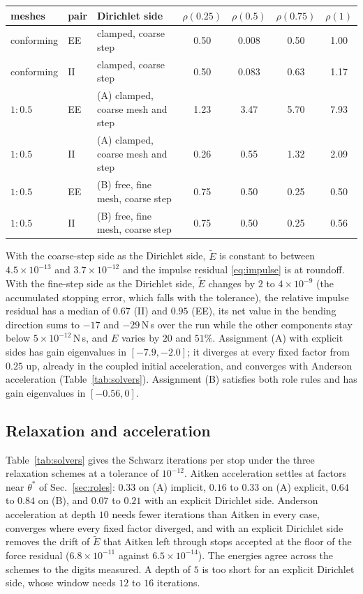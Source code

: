\documentclass[11pt]{article}
\begin{document}
\begin{table}[htbp]
\medskip
\begin{tabular}{lllcccc}
\toprule
meshes & pair & Dirichlet side & $\rho(0.25)$ & $\rho(0.5)$ & $\rho(0.75)$ & $\rho(1)$ \\
\midrule
conforming & EE & clamped, coarse step & 0.50 & 0.008 & 0.50 & 1.00 \\
conforming & II & clamped, coarse step & 0.50 & 0.083 & 0.63 & 1.17 \\
$1{:}0.5$ & EE & (A) clamped, coarse mesh and step & 1.23 & 3.47 & 5.70 & 7.93 \\
$1{:}0.5$ & II & (A) clamped, coarse mesh and step & 0.26 & 0.55 & 1.32 & 2.09 \\
$1{:}0.5$ & EE & (B) free, fine mesh, coarse step & 0.75 & 0.50 & 0.25 & 0.50 \\
$1{:}0.5$ & II & (B) free, fine mesh, coarse step & 0.75 & 0.50 & 0.25 & 0.56 \\
\bottomrule
\end{tabular}
\end{table}

With the coarse-step side as the Dirichlet side, $\tilde{E}$ is constant to
between $4.5\times 10^{-13}$ and $3.7\times 10^{-12}$ and the impulse
residual \eqref{eq:impulse} is at roundoff. With the fine-step side as the
Dirichlet side, $\tilde{E}$ changes by $2$ to $4\times 10^{-9}$ (the
accumulated stopping error, which falls with the tolerance), the relative
impulse residual has a median of $0.67$ (II) and $0.95$ (EE), its net value
in the bending direction sums to $-17$ and $-29$\,N\,s over the run while
the other components stay below $5\times 10^{-12}$\,N\,s, and $E$ varies by
$20$ and $51\%$. Assignment (A) with explicit sides has gain eigenvalues in
$[-7.9, -2.0]$; it diverges at every fixed factor from $0.25$ up, already in
the coupled initial acceleration, and converges with Anderson acceleration
(Table~\ref{tab:solvers}). Assignment (B) satisfies both role rules and has
gain eigenvalues in $[-0.56, 0]$.

\subsection{Relaxation and acceleration}
\label{sec:verify-relaxation}

Table~\ref{tab:solvers} gives the Schwarz iterations per stop under the
three relaxation schemes at a tolerance of $10^{-12}$. Aitken acceleration
settles at factors near $\theta^\ast$ of Sec.~\ref{sec:roles}: $0.33$ on
(A) implicit, $0.16$ to $0.33$ on (A) explicit, $0.64$ to $0.84$ on (B), and
$0.07$ to $0.21$ with an explicit Dirichlet side. Anderson acceleration at
depth $10$ needs fewer iterations than Aitken in every case, converges
where every fixed factor diverged, and with an explicit Dirichlet side
removes the drift of $\tilde{E}$ that Aitken left through stops accepted at
the floor of the force residual ($6.8\times 10^{-11}$ against
$6.5\times 10^{-14}$). The energies agree across the schemes to the digits
measured. A depth of $5$ is too short for an explicit Dirichlet side,
whose window needs $12$ to $16$ iterations.
\end{document}
